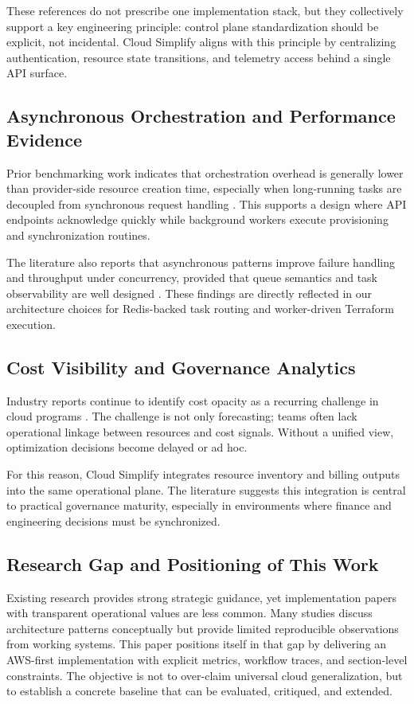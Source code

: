 These references do not prescribe one implementation stack, but they collectively support a key engineering principle: control plane standardization should be explicit, not incidental. Cloud Simplify aligns with this principle by centralizing authentication, resource state transitions, and telemetry access behind a single API surface.

\subsection{Asynchronous Orchestration and Performance Evidence}
Prior benchmarking work indicates that orchestration overhead is generally lower than provider-side resource creation time, especially when long-running tasks are decoupled from synchronous request handling \cite{terraform_performance_2023, wjarr2024}. This supports a design where API endpoints acknowledge quickly while background workers execute provisioning and synchronization routines.

The literature also reports that asynchronous patterns improve failure handling and throughput under concurrency, provided that queue semantics and task observability are well designed \cite{celery_docs}. These findings are directly reflected in our architecture choices for Redis-backed task routing and worker-driven Terraform execution.

\subsection{Cost Visibility and Governance Analytics}
Industry reports continue to identify cost opacity as a recurring challenge in cloud programs \cite{flexera2024, mckinsey2023costs}. The challenge is not only forecasting; teams often lack operational linkage between resources and cost signals. Without a unified view, optimization decisions become delayed or ad hoc.

For this reason, Cloud Simplify integrates resource inventory and billing outputs into the same operational plane. The literature suggests this integration is central to practical governance maturity, especially in environments where finance and engineering decisions must be synchronized.

\subsection{Research Gap and Positioning of This Work}
Existing research provides strong strategic guidance, yet implementation papers with transparent operational values are less common. Many studies discuss architecture patterns conceptually but provide limited reproducible observations from working systems. This paper positions itself in that gap by delivering an AWS-first implementation with explicit metrics, workflow traces, and section-level constraints. The objective is not to over-claim universal cloud generalization, but to establish a concrete baseline that can be evaluated, critiqued, and extended.
